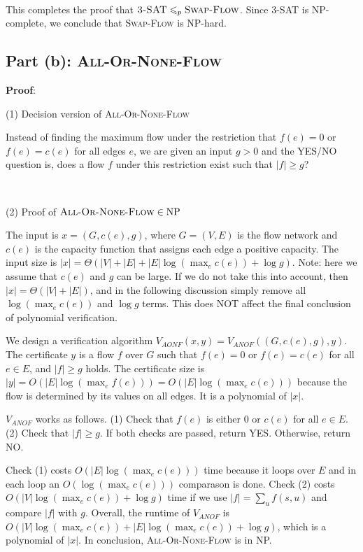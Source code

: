 \documentclass{article}
\begin{document}
~

This completes the proof that $\textsc{3-SAT}\leqslant_p\textsc{Swap-Flow}$. Since \textsc{3-SAT} is NP-complete, we conclude that \textsc{Swap-Flow} is NP-hard.

\subsection{Part (b): \textsc{All-Or-None-Flow}}
\noindent\textbf{Proof}:

\noindent(1) Decision version of \textsc{All-Or-None-Flow}

Instead of finding the maximum flow under the restriction that $f(e)=0$ or $f(e)=c(e)$ for all edges $e$, we are given an input $g>0$ and the YES/NO question is, does a flow $f$ under this restriction exist such that $|f|\geqslant g$?

~

\noindent(2) Proof of $\textsc{All-Or-None-Flow}\in\textup{NP}$

The input is $x=(G,c(e),g)$, where $G=(V,E)$ is the flow network and $c(e)$ is the capacity function that assigns each edge a positive capacity. The input size is $|x|=\Theta(|V|+|E|+|E|\log(\max_ec(e))+\log g)$. Note: here we assume that $c(e)$ and $g$ can be large. If we do not take this into account, then $|x|=\Theta(|V|+|E|)$, and in the following discussion simply remove all $\log(\max_ec(e))$ and $\log g$ terms. This does NOT affect the final conclusion of polynomial verification.

We design a verification algorithm $V_{AONF}(x,y)=V_{ANOF}((G,c(e),g),y)$. The certificate $y$ is a flow $f$ over $G$ such that $f(e)=0$ or $f(e)=c(e)$ for all $e\in E$, and $|f|\geqslant g$ holds. The certificate size is $|y|=O(|E|\log(\max_ef(e)))=O(|E|\log(\max_ec(e)))$ because the flow is determined by its values on all edges. It is a polynomial of $|x|$.

$V_{ANOF}$ works as follows. (1) Check that $f(e)$ is either 0 or $c(e)$ for all $e\in E$. (2) Check that $|f|\geqslant g$. If both checks are passed, return YES. Otherwise, return NO.

Check (1) costs $O(|E|\log(\max_ec(e)))$ time because it loops over $E$ and in each loop an $O(\log(\max_ec(e)))$ comparason is done. Check (2) costs $O(|V|\log(\max_ec(e))+\log g)$ time if we use $|f|=\sum_uf(s,u)$ and compare $|f|$ with $g$. Overall, the runtime of $V_{ANOF}$ is $O(|V|\log(\max_ec(e))+|E|\log(\max_ec(e))+\log g)$, which is a polynomial of $|x|$. In conclusion, \textsc{All-Or-None-Flow} is in NP.
\end{document}
